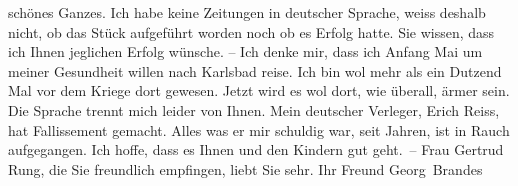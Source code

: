 \begin{ledgroupsized}[t]{13cm}
                    schönes Ganzes.\pend
           \pstart
           {\pb}Ich habe keine Zeitungen in
                    deutscher Sprache, weiss deshalb nicht, ob das Stück aufgeführt worden noch ob es Erfolg hatte. Sie
                    wissen, dass ich Ihnen jeglichen Erfolg wünsche. – Ich denke mir, dass ich
                        Anfang Mai um meiner Gesundheit willen nach Karlsbad reise. Ich bin wol mehr als ein Dutzend Mal vor
                    dem Kriege dort gewesen. Jetzt wird es wol dort, wie überall,  ärmer sein. Die Sprache trennt mich leider
                    von Ihnen. Mein deutscher Verleger, Erich
                        Reiss, hat Fallissement gemacht. Alles was er mir schuldig war, seit
                    Jahren, ist in Rauch aufgegangen.\pend
           \pstart
           Ich hoffe, dass es Ihnen und den Kindern gut geht. – Frau Gertrud Rung, die Sie freundlich empfingen, liebt Sie
                    sehr. Ihr Freund \spacefill\mbox{Georg Brandes}\pend
           
         
         \endnumbering{}\end{ledgroupsized}  \newcommand{\dateiname}{L02470}\newcommand{\titel}{Georg Brandes an Arthur Schnitzler, 21. 4. 1926}\newcommand{\editorInnen}{Martin Anton Müller und Gerd-Hermann Susen}
      